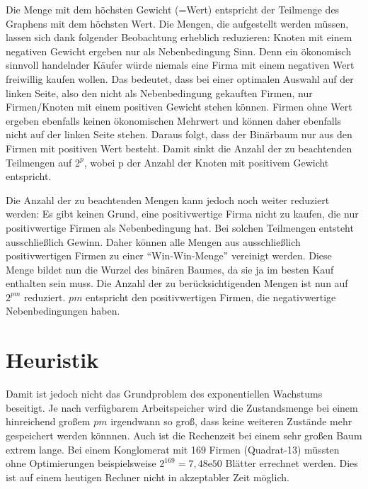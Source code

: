 Die Menge mit dem höchsten Gewicht (=Wert) entspricht der Teilmenge des Graphens mit dem höchsten Wert.
Die Mengen, die aufgestellt werden müssen, lassen sich dank folgender Beobachtung erheblich reduzieren:
Knoten mit einem negativen Gewicht ergeben nur als Nebenbedingung Sinn. Denn ein ökonomisch sinnvoll handelnder Käufer würde niemals eine Firma mit einem negativen Wert freiwillig kaufen wollen. Das bedeutet, dass bei einer optimalen Auswahl auf der linken Seite, also den nicht als Nebenbedingung gekauften Firmen, nur Firmen/Knoten mit einem positiven Gewicht stehen können. Firmen ohne Wert ergeben ebenfalls keinen ökonomischen Mehrwert und können daher ebenfalls nicht auf der linken Seite stehen. Daraus folgt, dass der Binärbaum nur aus den Firmen mit positiven Wert besteht. Damit sinkt die Anzahl der zu beachtenden Teilmengen auf \(2^p\), wobei p der Anzahl der Knoten mit positivem Gewicht entspricht.

Die Anzahl der zu beachtenden Mengen kann jedoch noch weiter reduziert werden: Es gibt keinen Grund, eine positivwertige Firma nicht zu kaufen, die nur positivwertige Firmen als Nebenbedingung hat. Bei solchen Teilmengen entsteht ausschließlich Gewinn. Daher können alle Mengen aus ausschließlich positivwertigen Firmen zu einer "`Win-Win-Menge"' vereinigt werden. Diese Menge bildet nun die Wurzel des binären Baumes, da sie ja im besten Kauf enthalten sein muss. Die Anzahl der zu berücksichtigenden Mengen ist nun auf \(2^{pm}\) reduziert. \(pm\) entspricht den positivwertigen Firmen, die negativwertige Nebenbedingungen haben.

\section{Heuristik}
Damit ist jedoch nicht das Grundproblem des exponentiellen Wachstums beseitigt. Je nach verfügbarem Arbeitspeicher wird die Zustandsmenge bei einem hinreichend großem \(pm\) irgendwann so groß, dass keine weiteren Zustände mehr gespeichert werden könnnen. Auch ist die Rechenzeit bei einem sehr großen Baum extrem lange. Bei einem Konglomerat mit 169 Firmen (Quadrat-13) müssten ohne Optimierungen beispielsweise \(2^{169}=7,48\mathrm{e}{50}\) Blätter errechnet werden. Dies ist auf einem heutigen Rechner nicht in akzeptabler Zeit möglich.

